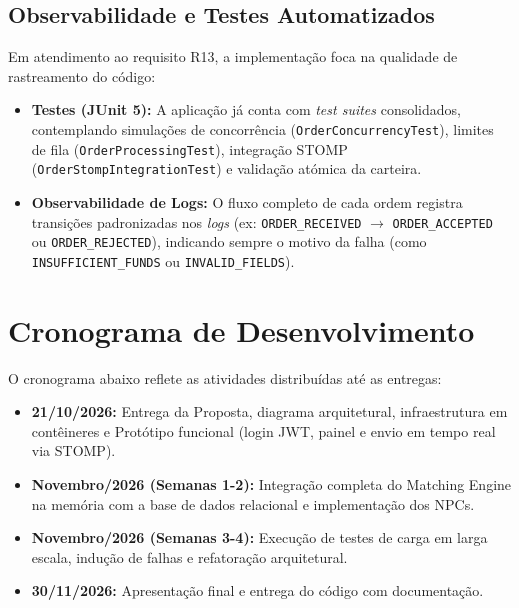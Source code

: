 \documentclass[12pt,a4paper]{article}
\begin{document}
\subsection{Observabilidade e Testes Automatizados}
Em atendimento ao requisito R13, a implementação foca na qualidade de rastreamento do código:
\begin{itemize}
    \item \textbf{Testes (JUnit 5):} A aplicação já conta com \textit{test suites} consolidados, contemplando simulações de concorrência (\texttt{OrderConcurrencyTest}), limites de fila (\texttt{OrderProcessingTest}), integração STOMP (\texttt{OrderStompIntegrationTest}) e validação atómica da carteira.
    \item \textbf{Observabilidade de Logs:} O fluxo completo de cada ordem registra transições padronizadas nos \textit{logs} (ex: \texttt{ORDER\_RECEIVED} $\rightarrow$ \texttt{ORDER\_ACCEPTED} ou \texttt{ORDER\_REJECTED}), indicando sempre o motivo da falha (como \texttt{INSUFFICIENT\_FUNDS} ou \texttt{INVALID\_FIELDS}).
\end{itemize}



\section{Cronograma de Desenvolvimento}
O cronograma abaixo reflete as atividades distribuídas até as entregas:
\begin{itemize}
    \item \textbf{21/10/2026:} Entrega da Proposta, diagrama arquitetural, infraestrutura em contêineres e Protótipo funcional (login JWT, painel e envio em tempo real via STOMP).
    \item \textbf{Novembro/2026 (Semanas 1-2):} Integração completa do Matching Engine na memória com a base de dados relacional e implementação dos NPCs.
    \item \textbf{Novembro/2026 (Semanas 3-4):} Execução de testes de carga em larga escala, indução de falhas e refatoração arquitetural.
    \item \textbf{30/11/2026:} Apresentação final e entrega do código com documentação.
\end{itemize}
\end{document}
